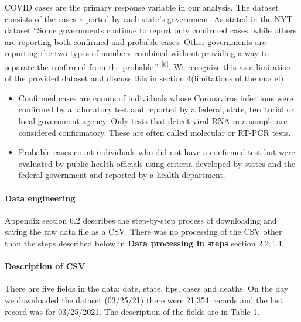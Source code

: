 \documentclass[
]{article}
\providecommand{\tightlist}{%
  \setlength{\itemsep}{0pt}\setlength{\parskip}{0pt}}
\begin{document}
COVID cases are the primary response variable in our analysis. The
dataset consists of the cases reported by each state's government. As
stated in the NYT dataset ``Some governments continue to report only
confirmed cases, while others are reporting both confirmed and probable
cases. Other governments are reporting the two types of numbers combined
without providing a way to separate the confirmed from the probable.''
\textsuperscript{{[}6{]}}. We recognize this as a limitation of the
provided dataset and discuss this in section 4(limitations of the model)

\begin{itemize}
\tightlist
\item
  Confirmed cases are counts of individuals whose Coronavirus infections
  were confirmed by a laboratory test and reported by a federal, state,
  territorial or local government agency. Only tests that detect viral
  RNA in a sample are considered confirmatory. These are often called
  molecular or RT-PCR tests.
\item
  Probable cases count individuals who did not have a confirmed test but
  were evaluated by public health officials using criteria developed by
  states and the federal government and reported by a health department.
\end{itemize}

\hypertarget{data-engineering}{%
\paragraph{\texorpdfstring{Data engineering\\
}{Data engineering }}\label{data-engineering}}

Appendix section 6.2 describes the step-by-step process of downloading
and saving the raw data file as a CSV. There was no processing of the
CSV other than the steps described below in \textbf{Data processing in
steps} section 2.2.1.4.

\hypertarget{description-of-csv}{%
\paragraph{\texorpdfstring{Description of CSV\\
}{Description of CSV }}\label{description-of-csv}}

There are five fields in the data: date, state, fips, cases and deaths.
On the day we downloaded the dataset (03/25/21) there were 21,354
records and the last record was for 03/25/2021. The description of the
fields are in Table 1.
\end{document}
